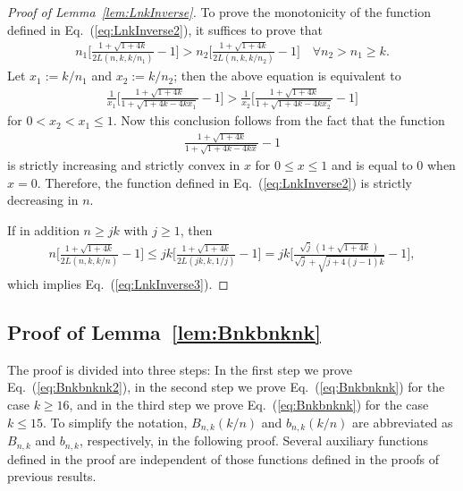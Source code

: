 \documentclass[aop]{imsart}
\theoremstyle{plain}
\theoremstyle{remark}
\newcommand{\1}{\operatorname{\uppercase\expandafter{\romannumeral1}}}
\newcommand{\2}{\operatorname{\uppercase\expandafter{\romannumeral2}}}
\newcommand{\3}{\operatorname{\uppercase\expandafter{\romannumeral3}}}
\newcommand{\4}{\operatorname{\uppercase\expandafter{\romannumeral4}}}
\newcommand{\5}{\operatorname{\uppercase\expandafter{\romannumeral5}}}
\newcommand{\6}{\operatorname{\uppercase\expandafter{\romannumeral6}}}
\newcommand{\7}{\operatorname{\uppercase\expandafter{\romannumeral7}}}
\newcommand{\8}{\operatorname{\uppercase\expandafter{\romannumeral8}}}
\newcommand{\9}{\operatorname{\uppercase\expandafter{\romannumeral9}}}
\newcommand{\eref}[1]{Eq.~\textup{(\ref{#1})}}
\newcommand{\lref}[1]{Lemma~\ref{#1}}
\begin{document}
\begin{appendix}
\begin{proof}[Proof of \lref{lem:LnkInverse}]
	
	To prove the monotonicity of the function defined in \eref{eq:LnkInverse2}, it suffices to prove that
	\begin{align}
	n_1\biggl[\frac{1+\sqrt{1+4k}}{2L(n,k,k/n_1)}-1\biggr]> n_2\biggl[\frac{1+\sqrt{1+4k}}{2L(n,k,k/n_2)}-1\biggr]\quad \forall n_2 > n_1 \geq k. 
	\end{align}
	Let $x_1:=k/n_1$ and $x_2:=k/n_2$; then the above equation is equivalent to 
	\begin{align}	\frac{1}{x_1}\biggl[\frac{1+\sqrt{1+4k}}{1+\sqrt{1+4k-4kx_1}}-1\biggr]>\frac{1}{x_2}\biggl[\frac{1+\sqrt{1+4k}}{1+\sqrt{1+4k-4kx_2}}-1\biggr]
	\end{align}
	for $0< x_2 < x_1\leq 1$.
	Now this conclusion follows from the fact that the function
	\begin{align}
	\frac{1+\sqrt{1+4k}}{1+\sqrt{1+4k-4kx}}-1
	\end{align} 
	is strictly increasing and strictly convex in $x$ for $0\leq x\leq 1$ and is equal to 0 when $x=0$. Therefore, the function defined in \eref{eq:LnkInverse2} is strictly decreasing in $n$.
	
	If in addition $n\geq jk$ with $j\geq 1$, then
	\begin{align} n\biggl[\frac{1+\sqrt{1+4k}}{2L(n,k,k/n)}-1\biggr]\leq jk\biggl[\frac{1+\sqrt{1+4k}}{2L(jk,k,1/j)}-1\biggr]=jk\biggl[\frac{\sqrt{j}\,(1+\sqrt{1+4k}\,)}{\sqrt{j}+\sqrt{j+4(j-1)k}}-1\biggr],
	\end{align}
	which implies \eref{eq:LnkInverse3}.
\end{proof}


\subsection{Proof of \lref{lem:Bnkbnknk}}
The proof is divided into three steps: In the first step  we prove  \eref{eq:Bnkbnknk2},  in the second step we prove   \eref{eq:Bnkbnknk} for the case $k\geq 16$, and in the third step we prove   \eref{eq:Bnkbnknk} for the case $k\leq 15$. To simplify the notation, $B_{n,k}(k/n)$  and $b_{n,k}(k/n)$ are abbreviated as $B_{n,k}$ and $b_{n,k}$, respectively, in the following proof. Several auxiliary functions defined in the  proof  are independent of those functions defined in the  proofs of previous results.  \\



\end{appendix}
\end{document}
